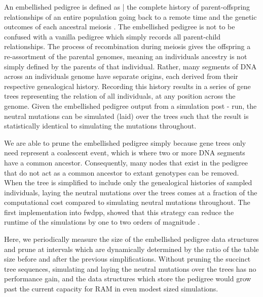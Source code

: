 \documentclass{article}
\begin{document}
An embellished pedigree is defined as
| the complete history of parent-offspring relationships of an entire population going back to a remote time
and the genetic outcomes of each ancestral meiosis \cite{Ralph2018}. 
The embellished pedigree is not to be confused with a vanilla pedigree which simply records all parent-child relationships. 
The process of recombination during meiosis gives the offspring a re-assortment of the parental genomes,
meaning an individuals ancestry is not simply defined by the parents of that individual.
Rather, many segments of DNA across an individuals genome have separate origins, 
each derived from their respective genealogical history.
Recording this history results in a series of gene trees representing the relation of all
individuals, at any position across the genome.
Given the embellished pedigree output from a simulation post - run,
the neutral mutations can be simulated (laid) over the trees 
such that the result is statistically identical to simulating the mutations throughout.

We are able to prune the embellished pedigree simply because gene trees only need represent a coalescent event, 
which is where two or more DNA segments have a common ancestor.
Consequently, many nodes that exist in the pedigree that do not act as a common ancestor 
to extant genotypes can be removed.
When the tree is simplified to include only the genealogical histories of sampled individuals,
laying the neutral mutations over the trees comes
at a fraction of the computational cost compared to simulating neutral mutations throughout.
The first implementation into fwdpp,
showed that this strategy can reduce the runtime of the simulations
by one to two orders of magnitude \cite{Ralph2018}.

Here, we periodically measure the size of the embellished pedigree data structures and prune
at intervals which are dynamically determined 
by the ratio of the table size before and after the previous simplifications.
Without pruning the succinct tree sequences, simulating and laying the neutral mutations over the trees has no performance gain,
and the data structures which store the pedigree
would grow past the current capacity for RAM in even modest sized simulations.
\end{document}
